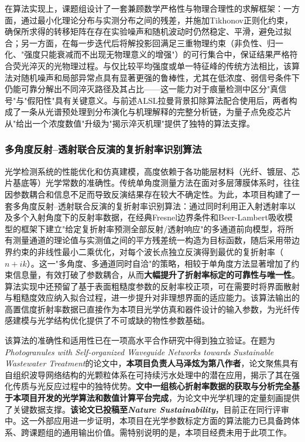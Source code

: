 \documentclass[12pt,a4paper]{article}
\begin{document}
在算法实现上，课题组设计了一套兼顾数学严格性与物理合理性的求解框架：一方面，通过最小化理论分布与实测分布之间的残差，并施加Tikhonov正则化约束，确保所求得的转移矩阵在存在实验噪声和随机波动时仍然稳定、平滑，避免过拟合；另一方面，在每一步迭代后将解投影回满足三重物理约束（非负性、归一化、"强度只能衰减而不出现无物理意义的增强"）的可行集合中，保证结果严格符合荧光淬灭的光物理过程。与仅比较平均强度或单一特征峰的传统方法相比，该算法对随机噪声和局部异常点具有显著更强的鲁棒性，尤其在低浓度、弱信号条件下仍能可靠分解出不同淬灭路径及其占比——这一能力对于痕量检测中区分"真信号"与"假阳性"具有关键意义。与前述ALSL拉曼背景扣除算法配合使用后，两者构成了一条从光谱预处理到分布演化与机理解释的完整分析链，为量子点免疫芯片从"给出一个浓度数值"升级为"揭示淬灭机理"提供了独特的算法支撑。

\subsubsection{多角度反射--透射联合反演的复折射率识别算法}

光学检测系统的性能优化和仿真建模，高度依赖于各功能层材料（光纤、镀层、芯片基底等）光学常数的准确性。传统单角度测量方法在面对多层薄膜体系时，往往因参数耦合和信息不足而导致反演结果存在较大不确定性。为此，本项目构建了一套多角度反射--透射联合反演的复折射率识别算法：通过同时利用正入射透射率以及多个入射角度下的反射率数据，在经典Fresnel边界条件和Beer-Lambert吸收模型的框架下建立"给定复折射率预测全部反射/透射响应"的多通道前向模型，将所有测量通道的理论值与实测值之间的平方残差统一构造为目标函数，随后采用带边界约束的非线性最小二乘优化，对每个波长点独立反演得到最优的复折射率（$n + ik$）。这一"多角度、多通道同时自洽"的策略，相较于单角度方法显著增加了约束信息量，有效打破了参数耦合，从而\textbf{大幅提升了折射率标定的可靠性与唯一性}。算法实现中还预留了基于表面粗糙度参数的反射率校正项，可在需要时将界面散射与粗糙度效应纳入拟合过程，进一步提升对非理想界面的适应能力。该算法输出的高置信度折射率数据已直接作为本项目光学仿真和器件设计的输入参数，为光纤传感建模与光学结构优化提供了不可或缺的物性参数基础。

该算法的准确性和适用性已在一项高水平合作研究中得到独立验证。在题为\textit{Photogranules with Self-organized Waveguide Networks towards Sustainable Wastewater Treatment}的论文中，\textbf{本项目负责人马泽炫为第八作者}，论文聚焦具有自组织波导网络结构的光颗粒体系在可持续污水处理中的潜在应用，揭示了其在强化传质与光反应过程中的独特优势。\textbf{文中一组核心折射率数据的获取与分析完全基于本项目开发的光学算法和数值计算平台完成}，为论文中光学机理的定量刻画提供了关键数据支撑。\textbf{该论文已投稿至\textit{Nature Sustainability}}，目前正在同行评审中。这一外部应用进一步证明，本项目在光学参数标定方面的算法能力已具备跨体系、跨课题组的通用输出价值。需特别说明的是，本项目经费未用于此项工作。
\end{document}
